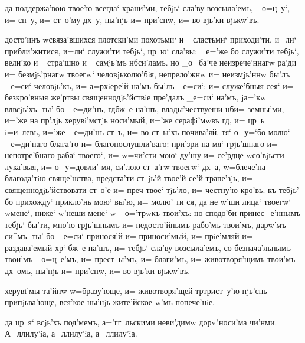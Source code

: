  да под\ъ держа'вою твое'ю всегда` храни'ми, 
тебjь` сла'ву возсыла'емъ, _о=ц~у`, и= сн~у, и= ст~о'му 
дх~у, ны'нjь и= при'снw, и= во вjь'ки вjькw'въ.



 досто'инъ w\т связа'вшихся плотски'ми 
похотьми` и= сластьми` приходи'ти, и=ли` прибли'житися, 
и=ли` служи'ти тебjь`, цр~ю` сла'вы: _е='же бо служи'ти 
тебjь`, вели'ко и= стра'шно и= самjь'мъ нб си'ламъ. 
но _о=ба'че неизрече'ннагw ра'ди и= безмjь'рнагw твоегw` 
человjьколю'бiя, непрело'жнw и= неизмjь'ннw бы'лъ _е=си` 
человjь'къ, и= а=рхiере'й на'мъ бы'лъ _е=си`: и= 
служе'бныя сея` и= безкро'вныя же'ртвы священнодjь'йствiе 
пре'далъ _е=си` на'мъ, jа='кw вл всjь'хъ. ты' бо 
_е=ди'нъ, гд бж~е на'шъ, влады'чествуеши нб и= 
земны'ми, и='же на пр'лjь херувi'мстjь носи'мый, 
и='же серафi'мwвъ гд, и= цр~ь i=и~левъ, и='же _е=ди'нъ 
ст~ъ, и= во ст~ы'хъ почива'яй. тя` о_у=`бо молю` 
_е=ди'наго блага'го и= благопослушли'ваго: при'зри на мя` 
грjь'шнаго и= непотре'бнаго раба` твоего`, и= w=чи'сти 
мою` ду'шу и= се'рдце w\т со'вjьсти лука'выя, и= 
о_у=довли' мя, си'лою ст~а'гw твоегw` дх~а, w=блече'на 
благода'тiю свяще'нства, предста'ти ст~jь'й твое'й се'й 
трапе'зjь, и= священнодjь'йствовати ст~о'е и= преч 
твое` тjь'ло, и= честну'ю кро'вь. къ тебjь' бо прихожду` 
прикло'нь мою` вы'ю, и= молю' ти ся, да не w'ши 
лица` твоегw` w\т мене`, ниже` w'неши мене` w\т 
_о='трwкъ твои'хъ: но сподо'би принес_е'ннымъ тебjь` 
бы'ти, мно'ю грjь'шнымъ и= недосто'йнымъ рабо'мъ твои'мъ, 
дарw'мъ си^мъ. ты' бо _е=си` принося'й и= приноси'мый, и= 
прiе'мляй и= раздава'емый хр` бж~е на'шъ, и= тебjь` 
сла'ву возсыла'емъ, со безнача'льнымъ твои'мъ _о=ц~е'мъ, 
и= прест~ы'мъ, и= благи'мъ, и= животворя'щимъ твои'мъ 
дх~омъ, ны'нjь и= при'снw, и= во вjь'ки вjькw'въ.


 херувi'мы та'йнw w=бразу'юще, и= животворя'щей 
тр трист~у'ю пjь'снь припjьва'юще, вся'кое ны'нjь 
жите'йское w'мъ попече'нiе.

 да цр~я` всjь'хъ под'мемъ, а='гг~льскими 
неви'димw дорv"носи'ма чи'нми. А=ллилу'iа, а=ллилу'iа, 
а=ллилу'iа.

